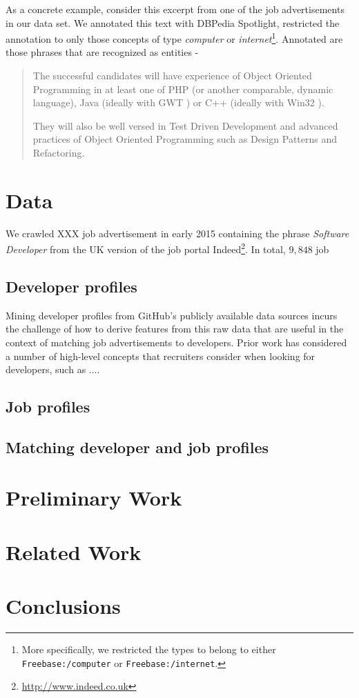 \documentclass[conference]{IEEEtran}
\begin{document}
As a concrete example, consider this excerpt from one of the job advertisements in our data set. We annotated this text with DBPedia Spotlight, restricted the annotation to only those concepts of type \emph{computer} or \emph{internet}\footnote{More specifically, we restricted the types to belong to either \texttt{Freebase:/computer} or \texttt{Freebase:/internet}.}. Annotated are those phrases that are recognized as entities - 

\begin{quote}
The successful candidates will have experience of Object Oriented Programming   in at least one of PHP  (or another comparable, dynamic language), Java  (ideally with GWT ) or C++  (ideally with Win32 ).
 
They will also be well versed in Test Driven Development and advanced practices of Object Oriented Programming such as Design Patterns and Refactoring.
\end{quote}

\section{Data}


We crawled XXX job advertisement in early 2015 containing the phrase \emph{Software Developer} from the UK version of the job portal Indeed\footnote{\url{http://www.indeed.co.uk}}. In total, $9,848$ job 


\subsection{Developer profiles}

Mining developer profiles from GitHub's publicly available data sources incurs the challenge of how to derive features from this raw data that are useful in the context of matching job advertisements to developers. Prior work has considered a number of high-level concepts that recruiters consider when looking for developers, such as ....

\subsection{Job profiles}

\subsection{Matching developer and job profiles}


\section{Preliminary Work}

\section{Related Work}

\section{Conclusions}



\end{document}
